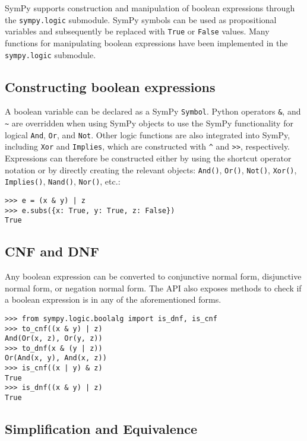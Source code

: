 
SymPy supports construction and manipulation of boolean expressions
through the \texttt{sympy.logic} submodule. SymPy symbols can be used as
propositional variables and subsequently be replaced with \texttt{True}
or \texttt{False} values. Many functions for manipulating boolean
expressions have been implemented in the \texttt{sympy.logic} submodule.

\subsection{Constructing boolean expressions}

A boolean variable can be declared as a SymPy \verb|Symbol|. Python operators
\texttt{\&}, \texttt{\textbar{}} and \texttt{\textasciitilde{}} are overridden
when using SymPy objects to use the SymPy functionality for logical
\texttt{And}, \texttt{Or}, and \texttt{Not}. Other logic functions are also
integrated into SymPy, including \texttt{Xor} and \texttt{Implies}, which are
constructed with \texttt{\^{}} and \texttt{\textgreater{}\textgreater{}},
respectively. Expressions can therefore be constructed either by using
the shortcut operator notation or by directly creating the relevant
objects: \verb|And()|,
\verb|Or()|, \verb|Not()|, \verb|Xor()|, \verb|Implies()|, \verb|Nand()|,
\verb|Nor()|, etc.:

\begin{verbatim}
>>> e = (x & y) | z
>>> e.subs({x: True, y: True, z: False})
True
\end{verbatim}

\subsection{CNF and DNF}

Any boolean expression can be converted to conjunctive normal form, disjunctive
normal form, or negation normal form. The API also exposes methods to check if
a boolean expression is in any of the aforementioned forms.

\begin{verbatim}
>>> from sympy.logic.boolalg import is_dnf, is_cnf
>>> to_cnf((x & y) | z)
And(Or(x, z), Or(y, z))
>>> to_dnf(x & (y | z))
Or(And(x, y), And(x, z))
>>> is_cnf((x | y) & z)
True
>>> is_dnf((x & y) | z)
True
\end{verbatim}

\subsection{Simplification and Equivalence}


